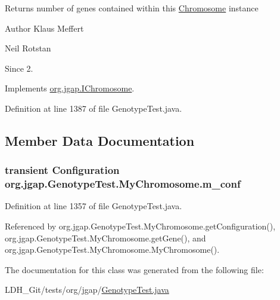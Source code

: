 \begin{DoxyReturn}{Returns}
number of genes contained within this \hyperlink{classorg_1_1jgap_1_1_chromosome}{Chromosome} instance
\end{DoxyReturn}
\begin{DoxyAuthor}{Author}
Klaus Meffert 

Neil Rotstan 
\end{DoxyAuthor}
\begin{DoxySince}{Since}
2. 
\end{DoxySince}


Implements \hyperlink{interfaceorg_1_1jgap_1_1_i_chromosome_a9b460ad665ea1ab4e789061233fc6fa3}{org.\-jgap.\-I\-Chromosome}.



Definition at line 1387 of file Genotype\-Test.\-java.



\subsection{Member Data Documentation}
\hypertarget{classorg_1_1jgap_1_1_genotype_test_1_1_my_chromosome_af945beb0c1e47fcb7f1cbbc4d2ecdf59}{
\subsubsection[{m\-\_\-conf}]{\setlength{\rightskip}{0pt plus 5cm}transient {\bf Configuration} org.\-jgap.\-Genotype\-Test.\-My\-Chromosome.\-m\-\_\-conf\hspace{0.3cm}{\ttfamily [private]}}}\label{classorg_1_1jgap_1_1_genotype_test_1_1_my_chromosome_af945beb0c1e47fcb7f1cbbc4d2ecdf59}


Definition at line 1357 of file Genotype\-Test.\-java.



Referenced by org.\-jgap.\-Genotype\-Test.\-My\-Chromosome.\-get\-Configuration(), org.\-jgap.\-Genotype\-Test.\-My\-Chromosome.\-get\-Gene(), and org.\-jgap.\-Genotype\-Test.\-My\-Chromosome.\-My\-Chromosome().



The documentation for this class was generated from the following file\-:\begin{DoxyCompactItemize}
\item 
L\-D\-H\-\_\-\-Git/tests/org/jgap/\hyperlink{_genotype_test_8java}{Genotype\-Test.\-java}\end{DoxyCompactItemize}
